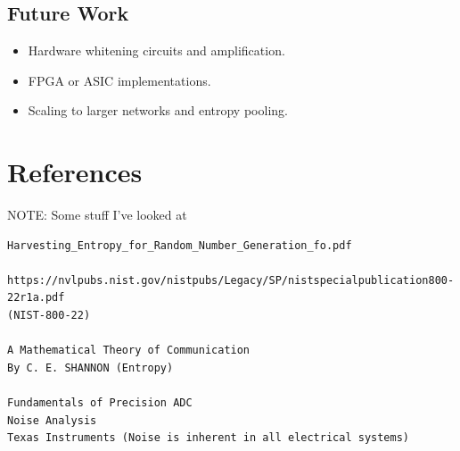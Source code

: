 \subsection{Future Work}
\begin{itemize}
    \item Hardware whitening circuits and amplification.
    \item FPGA or ASIC implementations.
    \item Scaling to larger networks and entropy pooling.
\end{itemize}

\newpage
\section*{References}

NOTE: Some stuff I've looked at 
\begin{verbatim}
Harvesting_Entropy_for_Random_Number_Generation_fo.pdf 

https://nvlpubs.nist.gov/nistpubs/Legacy/SP/nistspecialpublication800-22r1a.pdf 
(NIST-800-22)

A Mathematical Theory of Communication
By C. E. SHANNON (Entropy)

Fundamentals of Precision ADC
Noise Analysis
Texas Instruments (Noise is inherent in all electrical systems)
\end{verbatim}




